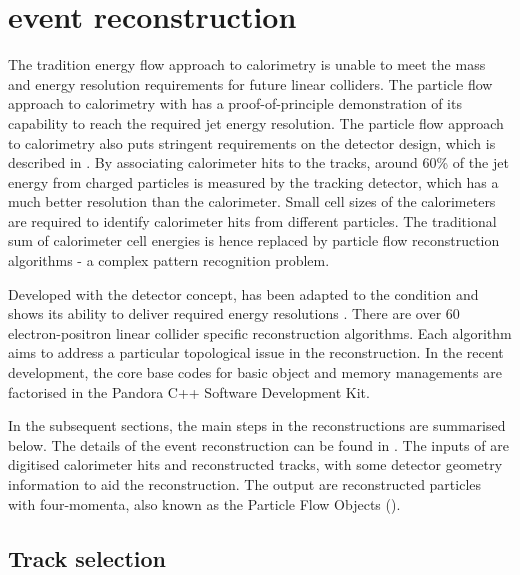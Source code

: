 \section{\pandora event reconstruction}
\label{sec:pandoraPandoraPFA}

The tradition energy flow approach to calorimetry is unable to meet the mass and energy resolution requirements for future linear colliders. The particle flow approach to calorimetry with \pandora has a proof-of-principle demonstration of its capability to reach the required jet energy resolution. The particle flow approach to calorimetry  also puts stringent requirements on the detector design, which is described in . By associating calorimeter hits to the tracks, around 60\% of the jet energy from charged particles is measured by the tracking detector, which has a much better resolution than the calorimeter. Small cell sizes of the calorimeters are required to identify calorimeter hits from different particles. The traditional sum of calorimeter cell energies is hence replaced by particle flow reconstruction algorithms - a complex pattern recognition problem.

Developed with the \ILD detector concept, \pandora has been adapted to the \CLIC condition and shows its ability to deliver required energy resolutions \cite{Linssen:2012hp}.  There are over 60 electron-positron linear collider specific reconstruction algorithms. Each algorithm aims to address a particular topological issue in the reconstruction. In the recent development, the core base codes for basic object and memory managements are factorised in the Pandora C++ Software Development Kit\cite{Marshall:2015rfa}.

In the subsequent sections, the main steps in the \pandora reconstructions are summarised below. The details of the \pandora event reconstruction can be found in \cite{Thomson:2009rp,Marshall:2012ry,Marshall:2015rfa}.  The inputs of \pandora are digitised calorimeter hits and reconstructed tracks, with some detector geometry information to aid the reconstruction. The output are reconstructed particles with four-momenta, also known as the Particle Flow Objects (\PFOs).

\subsection{Track selection}
\label{sec:pandoraPandoraTrack}

